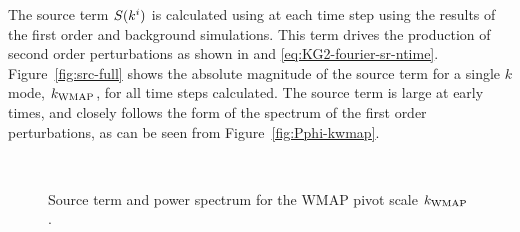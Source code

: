 The source term $S(k^i)$ is calculated using  at each time
step using the results of the first order and background simulations. This term
drives the production of second order perturbations as shown in
 and
\eqref{eq:KG2-fourier-sr-ntime}. Figure~\ref{fig:src-full} shows the
absolute magnitude of the source term for a single $k$ mode, $\kwmap$,
for all time steps calculated. 
The source term is large at early times, and closely follows the form
of the spectrum of the first order perturbations, as can be seen from
Figure~\ref{fig:Pphi-kwmap}.
% 
\begin{figure}[htbp]
\centering
{}\\
% 
\caption[The source term and power spectrum for $\kwmap$]{Source term and power
spectrum for the WMAP pivot scale $\kwmap$.}
\end{figure}
